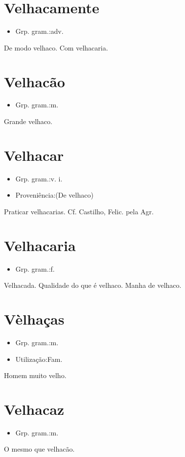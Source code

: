 \documentclass{article}
\begin{document}
\section{Velhacamente}
\begin{itemize}
\item {Grp. gram.:adv.}
\end{itemize}
De modo velhaco.
Com velhacaria.
\section{Velhacão}
\begin{itemize}
\item {Grp. gram.:m.}
\end{itemize}
Grande velhaco.
\section{Velhacar}
\begin{itemize}
\item {Grp. gram.:v. i.}
\end{itemize}
\begin{itemize}
\item {Proveniência:(De \textunderscore velhaco\textunderscore )}
\end{itemize}
Praticar velhacarias. Cf. Castilho, \textunderscore Felic. pela Agr.\textunderscore 
\section{Velhacaria}
\begin{itemize}
\item {Grp. gram.:f.}
\end{itemize}
Velhacada.
Qualidade do que é velhaco.
Manha de velhaco.
\section{Vèlhaças}
\begin{itemize}
\item {Grp. gram.:m.}
\end{itemize}
\begin{itemize}
\item {Utilização:Fam.}
\end{itemize}
Homem muito velho.
\section{Velhacaz}
\begin{itemize}
\item {Grp. gram.:m.}
\end{itemize}
O mesmo que \textunderscore velhacão\textunderscore .
\end{document}
